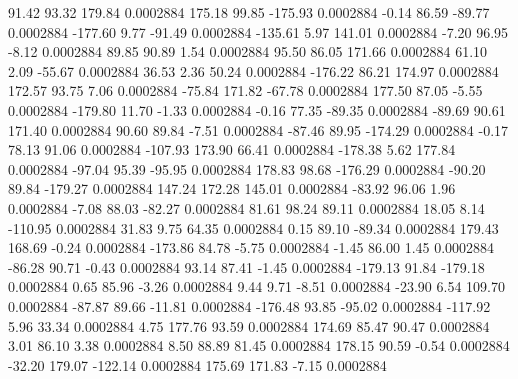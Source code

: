        91.42       93.32      179.84     0.0002884
      175.18       99.85     -175.93     0.0002884
       -0.14       86.59      -89.77     0.0002884
     -177.60        9.77      -91.49     0.0002884
     -135.61        5.97      141.01     0.0002884
       -7.20       96.95       -8.12     0.0002884
       89.85       90.89        1.54     0.0002884
       95.50       86.05      171.66     0.0002884
       61.10        2.09      -55.67     0.0002884
       36.53        2.36       50.24     0.0002884
     -176.22       86.21      174.97     0.0002884
      172.57       93.75        7.06     0.0002884
      -75.84      171.82      -67.78     0.0002884
      177.50       87.05       -5.55     0.0002884
     -179.80       11.70       -1.33     0.0002884
       -0.16       77.35      -89.35     0.0002884
      -89.69       90.61      171.40     0.0002884
       90.60       89.84       -7.51     0.0002884
      -87.46       89.95     -174.29     0.0002884
       -0.17       78.13       91.06     0.0002884
     -107.93      173.90       66.41     0.0002884
     -178.38        5.62      177.84     0.0002884
      -97.04       95.39      -95.95     0.0002884
      178.83       98.68     -176.29     0.0002884
      -90.20       89.84     -179.27     0.0002884
      147.24      172.28      145.01     0.0002884
      -83.92       96.06        1.96     0.0002884
       -7.08       88.03      -82.27     0.0002884
       81.61       98.24       89.11     0.0002884
       18.05        8.14     -110.95     0.0002884
       31.83        9.75       64.35     0.0002884
        0.15       89.10      -89.34     0.0002884
      179.43      168.69       -0.24     0.0002884
     -173.86       84.78       -5.75     0.0002884
       -1.45       86.00        1.45     0.0002884
      -86.28       90.71       -0.43     0.0002884
       93.14       87.41       -1.45     0.0002884
     -179.13       91.84     -179.18     0.0002884
        0.65       85.96       -3.26     0.0002884
        9.44        9.71       -8.51     0.0002884
      -23.90        6.54      109.70     0.0002884
      -87.87       89.66      -11.81     0.0002884
     -176.48       93.85      -95.02     0.0002884
     -117.92        5.96       33.34     0.0002884
        4.75      177.76       93.59     0.0002884
      174.69       85.47       90.47     0.0002884
        3.01       86.10        3.38     0.0002884
        8.50       88.89       81.45     0.0002884
      178.15       90.59       -0.54     0.0002884
      -32.20      179.07     -122.14     0.0002884
      175.69      171.83       -7.15     0.0002884
